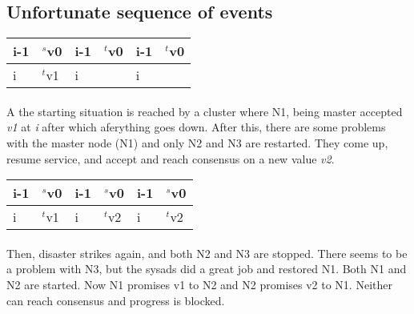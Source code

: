 \subsection{Unfortunate sequence of events}
\begin{supertabular}{|l|l|l|l|l|l|}
  i-1 & $^s$v0 & i-1 & $^t$v0 & i-1 & $^t$v0\\\hline
  i   & $^t$v1 &   i &        &   i &       \\
\hline
\end{supertabular}
\paragraph{}
A the starting situation is reached by a cluster where N1, being master accepted \emph{v1} at \emph{i} after which aferything goes down.
After this, there are some problems with the master node (N1) and only N2 and N3 are restarted.
They come up, resume service, and accept and reach consensus on a new value \emph{v2}.
\\
\begin{supertabular}{|l|l|l|l|l|l|}
  i-1 & $^s$v0 & i-1 & $^s$v0 & i-1 & $^s$v0\\\hline
  i   & $^t$v1 &   i & $^t$v2 &   i & $^t$v2\\
\hline
\end{supertabular}
\paragraph{}
Then, disaster strikes again, and both N2 and N3 are stopped. 
There seems to be a problem with N3, but the sysads did a great job and restored N1.
Both N1 and N2 are started. 
Now N1 promises v1 to N2 and N2 promises v2 to N1. 
Neither can reach consensus and progress is blocked.



